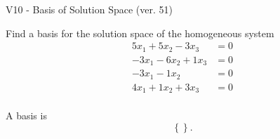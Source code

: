 \begin{exercise}
  \begin{exerciseTitle}V10 - Basis of Solution Space (ver. 51)\end{exerciseTitle}
  \begin{exerciseStatement}
    Find a basis for the solution space of the homogeneous system 
\begin{align*}
 5 x_ 1 + 5 x_ 2 -3 x_ 3 &= 0  \\ 
  -3 x_ 1 -6 x_ 2 + 1 x_ 3 &= 0  \\ 
  -3 x_ 1 -1 x_ 2 &= 0  \\ 
  4 x_ 1 + 1 x_ 2 + 3 x_ 3 &= 0  \\ 
 \end{align*}


 
  \end{exerciseStatement}

  \begin{exerciseAnswer}
   A basis is   
\[\left\{\right\}.\]

  


  \end{exerciseAnswer}
\end{exercise}
